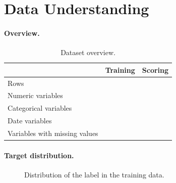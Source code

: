 \section{Data Understanding}
\label{sec:data-understanding}

\paragraph{Overview.}

\begin{table}[h]
  \centering\small
  \caption{Dataset overview.}
  \label{tab:overview}
  \begin{tabular}{lrr}
    \toprule
    & Training & Scoring \\
    \midrule
    Rows                     & \todo{} & \todo{} \\
    Numeric variables        & \todo{} & \todo{} \\
    Categorical variables    & \todo{} & \todo{} \\
    Date variables           & \todo{} & \todo{} \\
    Variables with missing values & \todo{} & \todo{} \\
    \bottomrule
  \end{tabular}
\end{table}

\paragraph{Target distribution.}

\begin{figure}[h]
  \centering
  \caption{Distribution of the \epc{} label in the training data.}
  \label{fig:target}
\end{figure}

